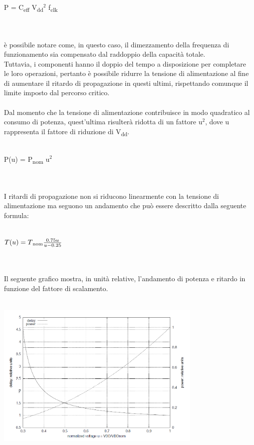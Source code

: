\documentclass[11pt,  english, makeidx, a4paper, titlepage, oneside]{book}
\begin{document}
\\\\
\centerline{P = C\textsubscript{eff} V\textsubscript{dd}$^2$ f\textsubscript{clk}}
\\\\
è possibile notare come, in questo caso, il dimezzamento della frequenza di funzionamento sia compensato dal raddoppio della capacità totale.
\\
Tuttavia, i componenti hanno il doppio del tempo a disposizione per completare le loro operazioni, pertanto è possibile ridurre la tensione di alimentazione al fine di aumentare il ritardo di propagazione in questi ultimi, rispettando comunque il limite imposto dal percorso critico.
\\\\
Dal momento che la tensione di alimentazione contribuisce in modo quadratico al consumo di potenza, quest'ultima risulterà ridotta di un fattore u$^2$, dove u rappresenta il fattore di riduzione di V\textsubscript{dd}.
\\\\
\centerline{P(u) = P\textsubscript{nom} u$^2$}
\\\\
I ritardi di propagazione non si riducono linearmente con la tensione di alimentazione ma seguono un andamento che può essere descritto dalla seguente formula:
\\\\
\centerline{$T(u) = T\textsubscript{nom} \frac{0.75u}{u-0.25}$}
\\\\
Il seguente grafico mostra, in unità relative, l'andamento di potenza e ritardo in funzione del fattore di scalamento.
\\\\
\centerline{\includegraphics[width=10cm]{./img/Lab_3/grafico_u.png}}
\\\\
\end{document}
